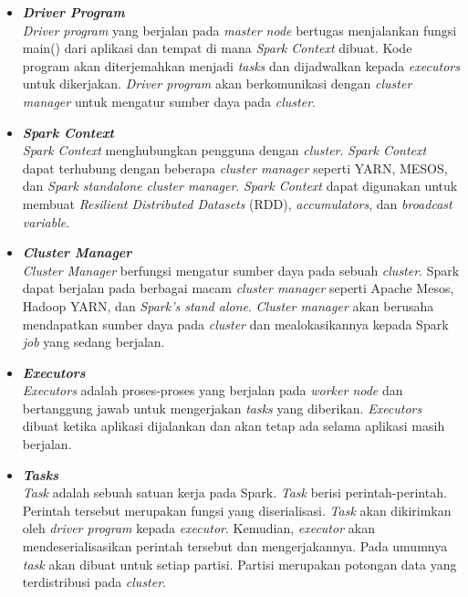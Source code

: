 \begin{itemize} 

\item \textbf{\textit{Driver Program}}\\
\textit{Driver program} yang berjalan pada \textit{master node} bertugas menjalankan fungsi main() dari aplikasi dan tempat di mana \textit{Spark Context} dibuat. Kode program akan diterjemahkan menjadi \textit{tasks} dan dijadwalkan kepada \textit{executors} untuk dikerjakan. \textit{Driver program} akan berkomunikasi dengan \textit{cluster manager} untuk mengatur sumber daya pada \textit{cluster}.\\

\item \textbf{\textit{Spark Context}}\\
\textit{Spark Context} menghubungkan pengguna dengan \textit{cluster}. \textit{Spark Context} dapat terhubung dengan beberapa \textit{cluster manager} seperti YARN, MESOS, dan \textit{Spark standalone cluster manager}. \textit{Spark Context} dapat digunakan untuk membuat \textit{Resilient Distributed Datasets} (RDD), \textit{accumulators}, dan \textit{broadcast variable}. 

\item \textbf{\textit{Cluster Manager}}\\
\textit{Cluster Manager} berfungsi mengatur sumber daya pada sebuah \textit{cluster}. Spark dapat berjalan pada berbagai macam \textit{cluster manager} seperti Apache Mesos, Hadoop YARN, dan \textit{Spark's stand alone}. \textit{Cluster manager} akan berusaha mendapatkan sumber daya pada \textit{cluster} dan mealokasikannya kepada Spark \textit{job} yang sedang berjalan.

\item \textbf{\textit{Executors}}\\
\textit{Executors} adalah proses-proses yang berjalan pada \textit{worker node} dan bertanggung jawab untuk mengerjakan \textit{tasks} yang diberikan. \textit{Executors} dibuat ketika aplikasi dijalankan dan akan tetap ada selama aplikasi masih berjalan.

\item \textbf{\textit{Tasks}}\\
\textit{Task} adalah sebuah satuan kerja pada Spark. \textit{Task} berisi perintah-perintah. Perintah tersebut merupakan fungsi yang diserialisasi. \textit{Task} akan dikirimkan oleh \textit{driver program} kepada \textit{executor}. Kemudian, \textit{executor} akan mendeserialisasikan perintah tersebut dan mengerjakannya. Pada umumnya \textit{task} akan dibuat untuk setiap partisi. Partisi merupakan potongan data yang terdistribusi pada \textit{cluster}.


\end{itemize}







